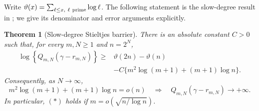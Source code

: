 \documentclass[11pt,a4paper]{article}
\numberwithin{equation}{section}
\newtheorem{theorem}{Theorem}[section]
\theoremstyle{definition}
\theoremstyle{remark}
\begin{document}
Write $\vartheta(x)=\sum_{\ell\le x,\ \ell\ {\rm prime}}\log\ell$.
The following statement is the slow-degree result in
\cite{VMRC019}; we give its denominator and error arguments explicitly.

\begin{theorem}[Slow-degree Stieltjes barrier]
\label{ga:slow-barrier}
There is an absolute constant $C>0$ such that, for every
$m,N\ge1$ and $n=2^N$,
\begin{equation}\label{ga:barrier}
\begin{split}
 \log\!\left\{Q_{m,N}(\gamma-r_{m,N})\right\}
 \ge{}&\vartheta(2n)-\vartheta(n)\\
 &-C\{m^2\log(m+1)+(m+1)\log n\}.
\end{split}
\end{equation}
Consequently, as $N\to\infty$,
\[
 m^2\log(m+1)+(m+1)\log n=o(n)
 \quad\Longrightarrow\quad
 Q_{m,N}(\gamma-r_{m,N})\longrightarrow+\infty.
 \tag{*}
\]
In particular, $(\ast)$ holds if
$m=o(\sqrt{n/\log n})$.
\end{theorem}
\end{document}
